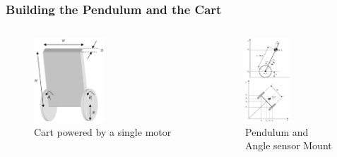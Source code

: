 \documentclass[aspectratio=169]{beamer}
\begin{document}
\begin{frame}
\frametitle{Building the Pendulum and the Cart}
\begin{columns}[c]

\begin{figure}
	\includegraphics[width=0.5\textwidth]{InvPen.eps}
	\caption	{Cart powered by a single motor}
\end{figure}
\begin{figure}
	\includegraphics[width=0.5\textwidth]{InvPenSideTop.eps}	
	\caption{Pendulum and Angle sensor Mount}
\end{figure}
\end{columns}
\end{frame}
\end{document}
